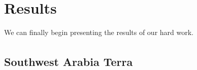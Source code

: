 \documentclass[12pt]{article}
\newcommand{\supcite}[1]{\textsuperscript{\cite{#1}}}
\begin{document}
\section{Results}
\label{sec:results}
\par We can finally begin presenting the results of our hard work.
\subsection{Southwest Arabia Terra\supcite{bib:ESP_011844_1855}}
\label{sub:southwest_arabia_terra}
\begin{figure}[h!]
  \centering
  \begin{subfigure}[t]{0.27\textwidth}
    \centering

\end{subfigure}
\end{figure}
\end{document}
